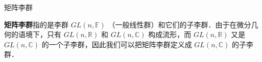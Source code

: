 
\begin{issues}
\issueDraft
\end{issues}


\begin{definition}{矩阵李群}

\textbf{矩阵李群}指的是李群 $GL(n, \mathbb{F})$ （一般线性群）和它们的子李群．由于在微分几何的语境下，只有 $GL(n, \mathbb{R})$ 和 $GL(n, \mathbb{C})$ 构成流形，而 $GL(n, \mathbb{R})$ 又是 $GL(n, \mathbb{C})$ 的一个子李群，因此我们可以把矩阵李群定义成 $GL(n, \mathbb{C})$ 的子李群．

\end{definition}
